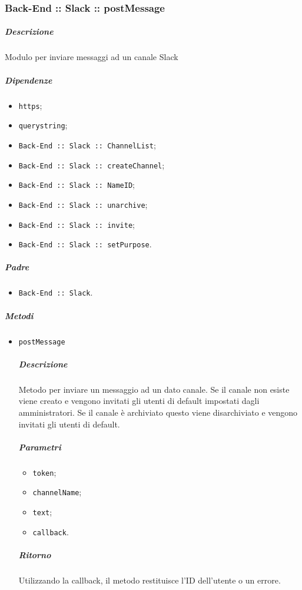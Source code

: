 \documentclass[../ManualeSviluppatore_v1.0.0.tex]{subfiles}
\begin{document}
\subsubsection{Back-End :: Slack :: postMessage}
\subparagraph{Descrizione} Modulo per inviare messaggi ad un canale Slack
\subparagraph{Dipendenze}
\begin{itemize}
	\item \texttt{https};
	\item \texttt{querystring};
	\item \texttt{Back-End :: Slack :: ChannelList};
	\item \texttt{Back-End :: Slack :: createChannel};
	\item \texttt{Back-End :: Slack :: NameID};
	\item \texttt{Back-End :: Slack :: unarchive};
	\item \texttt{Back-End :: Slack :: invite};
	\item \texttt{Back-End :: Slack :: setPurpose}.
\end{itemize}
\subparagraph{Padre}
\begin{itemize}
	\item \texttt{Back-End :: Slack}.
\end{itemize}
\subparagraph{Metodi}
\begin{itemize}
	\item \texttt{postMessage}
	      \subparagraph{Descrizione} Metodo per inviare un messaggio ad un dato canale. Se il canale non esiste viene creato e vengono invitati gli utenti di default impostati dagli amministratori. Se il canale è archiviato questo viene disarchiviato e vengono invitati gli utenti di default.
	      \subparagraph{Parametri}
	      \begin{itemize}
	      	\item \texttt{token};
	      	\item \texttt{channelName};
	      	\item \texttt{text};
	      	\item \texttt{callback}.
	      \end{itemize}
	      \subparagraph{Ritorno} Utilizzando la callback, il metodo restituisce l'ID dell'utente o un errore.
\end{itemize}
\end{document}
